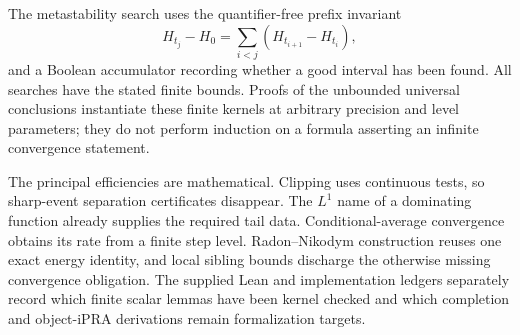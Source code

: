 The metastability search uses the quantifier-free prefix invariant
\[
 H_{t_j}-H_0=\sum_{i<j}(H_{t_{i+1}}-H_{t_i}),
 \]
and a Boolean accumulator recording whether a good interval has been
found.  All searches have the stated finite bounds.  Proofs of the
unbounded universal conclusions instantiate these finite kernels at
arbitrary precision and level parameters; they do not perform induction on
a formula asserting an infinite convergence statement.

The principal efficiencies are mathematical.  Clipping uses continuous
tests, so sharp-event separation certificates disappear.  The \(L^1\) name
of a dominating function already supplies the required tail data.
Conditional-average convergence obtains its rate from a finite step level.
Radon--Nikodym construction reuses one exact energy identity, and local
sibling bounds discharge the otherwise missing convergence obligation.
The supplied Lean and implementation ledgers separately record which
finite scalar lemmas have been kernel checked and which completion and
object-iPRA derivations remain formalization targets.
